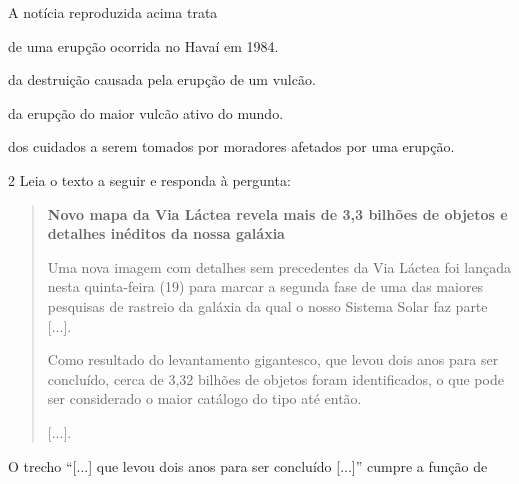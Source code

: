 A notícia reproduzida acima trata

\begin{escolha}
\item de uma erupção ocorrida no Havaí em 1984.

\item da destruição causada pela erupção de um vulcão.

\item da erupção do maior vulcão ativo do mundo.

\item dos cuidados a serem tomados por moradores afetados por uma erupção.
\end{escolha}


\num{2} Leia o texto a seguir e responda à pergunta:

\begin{quote}
\textbf{Novo mapa da Via Láctea revela mais de 3,3 bilhões de objetos e
detalhes inéditos da nossa galáxia}

Uma nova imagem com detalhes sem precedentes da Via Láctea foi lançada
nesta quinta-feira (19) para marcar a segunda fase de uma das maiores
pesquisas de rastreio da galáxia da qual o nosso Sistema Solar faz parte
{[}...{]}.

Como resultado do levantamento gigantesco, que levou dois anos para ser
concluído, cerca de 3,32 bilhões de objetos foram identificados, o que
pode ser considerado o maior catálogo do tipo até então.

{[}...{]}.
\end{quote}

O trecho ``{[}...{]} que levou dois anos para ser concluído {[}...{]}''
cumpre a função de

